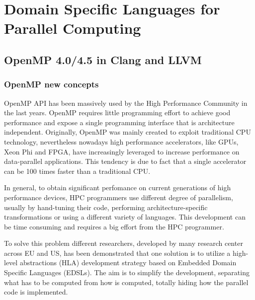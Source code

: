 \chapter{Domain Specific Languages for Parallel Computing}


\section{OpenMP 4.0/4.5 in Clang and LLVM}


\subsection{OpenMP new concepts}

OpenMP API has been massively used by the High Performance Community in the last years.
OpenMP requires little programming effort to achieve good performance and expose a single programming interface that is architecture independent. Originally, OpenMP was mainly created to exploit traditional CPU technology, nevertheless nowadays high performance accelerators, like GPUs, Xeon Phi and FPGA, have increasingly leveraged to increase performance on data-parallel applications. This tendency is due to fact that a single accelerator can be 100 times faster than a traditional CPU.


In general, to obtain significant perfomance on current generations of high performance devices, HPC programmers use different degree of parallelism, usually by hand-tuning their code, performing architecture-specific transformations or using a different variety of languages. This development can be time consuming and requires a big effort from the HPC programmer.



To solve this problem different researchers, developed by many research center across EU and US, has been demonstrated that one solution is to utilize a high-level abstractions (HLA) development strategy based on Embedded Domain Specific Languages (EDSLs). The aim is to simplify the development, separating what has to be computed from how is computed, totally hiding how the parallel code is implemented. 

